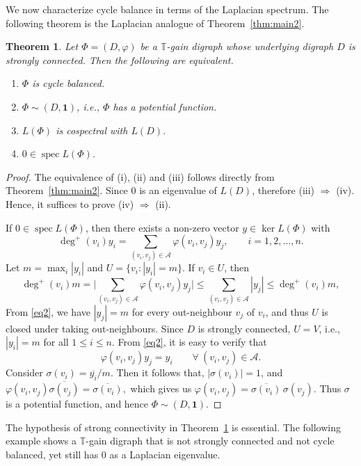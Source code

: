\documentclass[12pt]{article}
\newtheorem{theorem}{Theorem}[section]
\theoremstyle{definition}
\DeclareMathOperator{\spec}{spec}
\newcommand{\TT}{\mathbb{T}}
\begin{document}
We now characterize cycle balance in terms of the Laplacian spectrum. The following theorem is the Laplacian analogue of Theorem~\ref{thm:main2}.

\begin{theorem}\label{thm:sc-balance}
Let $\Phi=(D,\varphi)$ be a $\mathbb{T}$-gain digraph whose underlying digraph
$D$ is strongly connected. Then the following are equivalent.
\begin{enumerate}[label=\textup{(\roman*)}]
\item $\Phi$ is cycle balanced.
\item $\Phi\sim(D,\mathbf1)$, i.e., $\Phi$ has a potential function.
\item $L(\Phi)$ is cospectral with $L(D)$.
\item $0\in\spec L(\Phi)$.
\end{enumerate}
\end{theorem}

\begin{proof}
The equivalence of {\rm(i)}, {\rm(ii)} and {\rm(iii)} follows directly from Theorem~\ref{thm:main2}. Since $0$ is an eigenvalue of $L(D)$, therefore {\rm(iii)} $\Rightarrow$ {\rm(iv)}. Hence, it suffices to prove
{\rm(iv) $\Rightarrow$ (ii)}.

If $0\in\spec L(\Phi)$, then there exists a non-zero vector $ y\in\ker L(\Phi)$ with
\[
\deg^{+}(v_i)y_i=\sum_{(v_i,v_j)\in \mathcal{A}}\varphi(v_i,v_j)y_j,
\qquad i=1,2, \dots,n.
\]
Let $m=\max_i|y_i|$ and $U=\{v_i:|y_i|=m\}$. If $v_i\in U$, then
\begin{equation}\label{eq2}
\deg^{+}(v_i)m
=\Big|\sum_{(v_i,v_j)\in \mathcal{A}}\varphi(v_i,v_j)y_j\Big|
\le\sum_{(v_i,v_j)\in \mathcal{A}}|y_j|
\le\deg^{+}(v_i)m,
\end{equation}
 From \eqref{eq2}, we have $|y_j|=m$ for every out-neighbour $v_j$ of $v_i$, and thus $U$ is closed under taking out-neighbours. Since $D$ is strongly connected, $U=V$, i.e.,
$|y_i|=m$ for all $1\leq i\leq n$. From \eqref{eq2}, it is easy to verify that
\[
\varphi(v_i,v_j)y_j=y_i
\qquad \forall \ (v_i,v_j)\in \mathcal{A}.
\]
Consider $\sigma(v_i)=\overline{y_i}/m$. Then it follows that, $|\sigma(v_i)|=1$, and
\(
\varphi(v_i,v_j)\overline{\sigma(v_j)}
=\overline{\sigma(v_i)},
\)
which gives us
\(
\varphi(v_i,v_j)
=\overline{\sigma(v_i)}\,\sigma(v_j).
\)
Thus $\sigma$ is a potential function, and hence
$\Phi\sim(D,\mathbf1)$.
\end{proof}

The hypothesis of strong connectivity in Theorem~\ref{thm:sc-balance} is essential. The following example shows a $\TT$-gain digraph that is not strongly connected and not cycle balanced, yet still has $0$ as a Laplacian eigenvalue.
 
\end{document}

